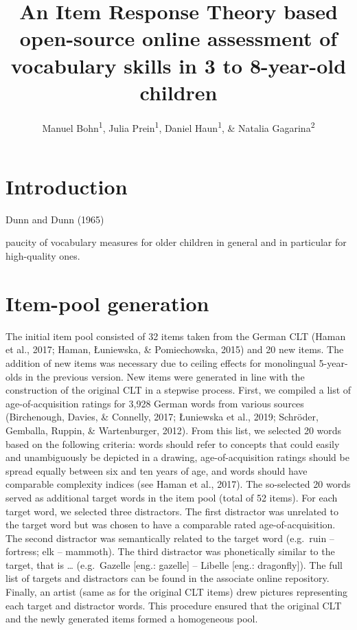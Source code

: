 \documentclass[
  man,floatsintext]{apa6}
\title{An Item Response Theory based open-source online assessment of vocabulary skills in 3 to 8-year-old children}
\author{Manuel Bohn\textsuperscript{1}, Julia Prein\textsuperscript{1}, Daniel Haun\textsuperscript{1}, \& Natalia Gagarina\textsuperscript{2}}
\date{}
\affiliation{\vspace{0.5cm}\textsuperscript{1} Department of Comparative Cultural Psychology, Max Planck Institute for Evolutionary Anthropology, Leipzig, Germany\\\textsuperscript{2} Leibniz-Zentrum Allgemeine Sprachwissenschaft, Berlin, Germany}
\begin{document}
\maketitle

\hypertarget{introduction}{%
\section{Introduction}\label{introduction}}

Dunn and Dunn (1965)

paucity of vocabulary measures for older children in general and in particular for high-quality ones.

\hypertarget{item-pool-generation}{%
\section{Item-pool generation}\label{item-pool-generation}}

The initial item pool consisted of 32 items taken from the German CLT (Haman et al., 2017; Haman, Łuniewska, \& Pomiechowska, 2015) and 20 new items. The addition of new items was necessary due to ceiling effects for monolingual 5-year-olds in the previous version. New items were generated in line with the construction of the original CLT in a stepwise process. First, we compiled a list of age-of-acquisition ratings for 3,928 German words from various sources (Birchenough, Davies, \& Connelly, 2017; Łuniewska et al., 2019; Schröder, Gemballa, Ruppin, \& Wartenburger, 2012). From this list, we selected 20 words based on the following criteria: words should refer to concepts that could easily and unambiguously be depicted in a drawing, age-of-acquisition ratings should be spread equally between six and ten years of age, and words should have comparable complexity indices (see Haman et al., 2017). The so-selected 20 words served as additional target words in the item pool (total of 52 items). For each target word, we selected three distractors. The first distractor was unrelated to the target word but was chosen to have a comparable rated age-of-acquisition. The second distractor was semantically related to the target word (e.g.~ruin -- fortress; elk -- mammoth). The third distractor was phonetically similar to the target, that is \ldots{} (e.g.~Gazelle {[}eng.: gazelle{]} -- Libelle {[}eng.: dragonfly{]}). The full list of targets and distractors can be found in the associate online repository. Finally, an artist (same as for the original CLT items) drew pictures representing each target and distractor words. This procedure ensured that the original CLT and the newly generated items formed a homogeneous pool.
\end{document}
